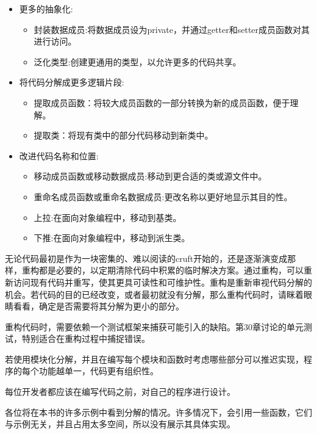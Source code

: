 \begin{itemize}
\item
更多的抽象化:

\begin{itemize}
\item
封装数据成员:将数据成员设为private，并通过getter和setter成员函数对其进行访问。

\item
泛化类型:创建更通用的类型，以允许更多的代码共享。
\end{itemize}

\item
将代码分解成更多逻辑片段:

\begin{itemize}
\item
提取成员函数：将较大成员函数的一部分转换为新的成员函数，便于理解。

\item
提取类：将现有类中的部分代码移动到新类中。
\end{itemize}

\item
改进代码名称和位置:

\begin{itemize}
\item
移动成员函数或移动数据成员:移动到更合适的类或源文件中。

\item
重命名成员函数或重命名数据成员:更改名称以更好地显示其目的性。

\item
上拉:在面向对象编程中，移动到基类。

\item
下推:在面向对象编程中，移动到派生类。
\end{itemize}
\end{itemize}

无论代码最初是作为一块密集的、难以阅读的cruft开始的，还是逐渐演变成那样，重构都是必要的，以定期清除代码中积累的临时解决方案。通过重构，可以重新访问现有代码并重写，使其更具可读性和可维护性。重构是重新审视代码分解的机会。若代码的目的已经改变，或者最初就没有分解，那么重构代码时，请眯着眼睛看看，确定是否需要将其分解为更小的部分。

重构代码时，需要依赖一个测试框架来捕获可能引入的缺陷。第30章讨论的单元测试，特别适合在重构过程中捕捉错误。


若使用模块化分解，并且在编写每个模块和函数时考虑哪些部分可以推迟实现，程序的每个功能越单一，代码更有组织性。

每位开发者都应该在编写代码之前，对自己的程序进行设计。


各位将在本书的许多示例中看到分解的情况。许多情况下，会引用一些函数，它们与示例无关，并且占用太多空间，所以没有展示其具体实现。

